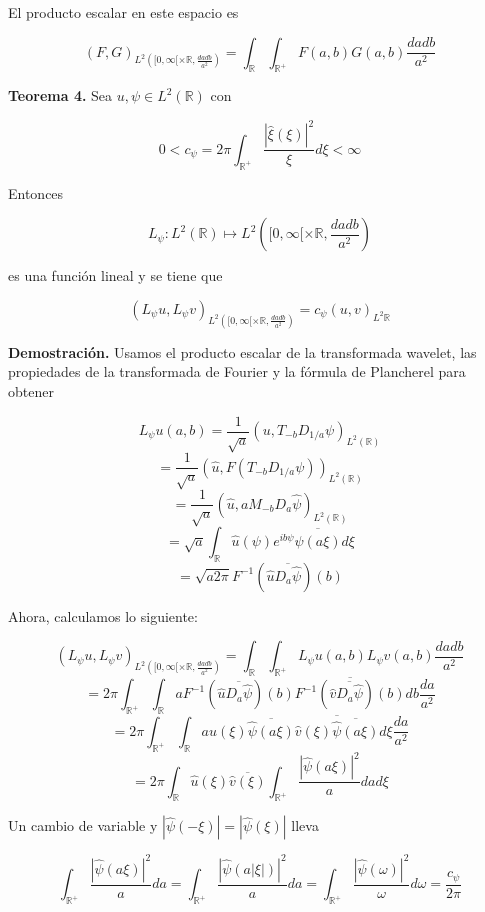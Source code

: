 \begin{itemize}
El producto escalar en este espacio es

$$(F,G)_{L^2 \left( [0,\infty[ \times \mathbb{R}, \frac{da db}{a^2}\right)} = \int_{\mathbb{R}} \int_{\mathbb{R}^+} F(a,b) G(a,b) \frac{da db}{a^2}$$

\textbf{Teorema 4.} Sea $u, \psi \in L^2(\mathbb{R})$ con 

$$ 0 < c_\psi = 2\pi \int_{\mathbb{R}^+} \frac{|\hat{\xi}(\xi)|^2}{\xi} d\xi < \infty$$

Entonces 

$$L_\psi : L^2(\mathbb{R}) \mapsto L^2 \left( [0,\infty[ \times \mathbb{R}, \frac{da db}{a^2}\right)$$

es una función lineal y se tiene que

$$(L_\psi u, L_\psi v)_{L^2 \left( [0,\infty[ \times \mathbb{R}, \frac{da db}{a^2}\right)} = c_\psi(u,v)_{L^2\mathbb{R}}$$

\textbf{Demostración.} Usamos el producto escalar de la transformada wavelet, las propiedades de la transformada de Fourier y la fórmula de Plancherel para obtener

$$L_\psi u (a,b) = \frac{1}{\sqrt{a}}(u,T_{-b}D_{1/a}\psi)_{L^2(\mathbb{R})}$$
$$ = \frac{1}{\sqrt{a}} (\hat{u}, F(T_{-b}D_{1/a}\psi))_{L^2(\mathbb{R})}$$
$$ = \frac{1}{\sqrt{a}} (\hat{u},aM_{-b}D_a\hat{\psi})_{L^2(\mathbb{R})}$$
$$=\sqrt{a} \int_{\mathbb{R}} \hat{u}(\psi)e^{ib\psi}\overline{\hat{\psi}(a\xi)} d\xi$$
$$= \sqrt{a 2\pi} F^{-1} (\hat{u}\overline{D_a \hat{\psi}})(b)$$

Ahora, calculamos lo siguiente:

$$(L_\psi u, L_\psi v)_{ L^2 \left( [0,\infty[ \times \mathbb{R}, \frac{da db}{a^2}\right)} = \int_{\mathbb{R}}
\int_{\mathbb{R}^+} L_\psi u(a,b) L_\psi v(a,b) \frac{da db}{a^2}$$
$$= 2\pi \int_{\mathbb{R}^+} \int_{\mathbb{R}} a F^{-1}(\hat{u}\overline{D_a \hat{\psi}})(b)\overline{F^{-1}(\hat{v}\overline{D_a \hat{\psi}})(b)} db \frac{da}{a^2}$$
$$ = 2\pi  \int_{\mathbb{R}^+} \int_{\mathbb{R}}
a \hat{u}(\xi) \overline{\hat{\psi}(a\xi)}\overline{\hat{v}(\xi)\overline{\hat{\psi}(a\xi)}} d\xi \frac{da}{a^2}$$
$$ = 2\pi \int_{\mathbb{R}} \hat{u}(\xi) \overline{\hat{v}(\xi)} \int_{\mathbb{R}^+} \frac{|\hat{\psi}(a\xi)|^2}{a} da d\xi$$

Un cambio de variable y $|\hat{\psi}(-\xi)| = |\hat{\psi}(\xi)|$ lleva 

$$\int_{\mathbb{R}^+} \frac{|\hat{\psi}(a\xi)|^2}{a} da = \int_{\mathbb{R}^+} \frac{|\hat{\psi}(a|\xi|)|^2}{a} da = \int_{\mathbb{R}^+} \frac{|\hat{\psi}(\omega)|^2}{\omega} d\omega = \frac{c_\psi}{2\pi}$$


\end{itemize}
